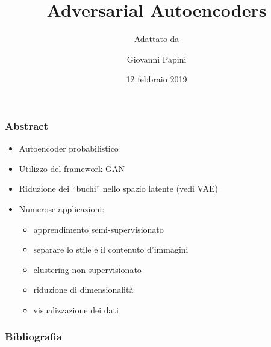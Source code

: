 \documentclass[11pt]{beamer}
\begin{document}
\author{Giovanni Papini}
\title{Adversarial Autoencoders}
\subtitle{Adattato da \cite{makhzani2015adversarial}}
\date{12 febbraio 2019}
\subject{autoencoders, neural network, AI}

\begin{frame}[plain]
\maketitle
\end{frame}

\begin{frame}
\frametitle{Abstract}

\begin{itemize}
  \item Autoencoder probabilistico
  \item Utilizzo del framework GAN
  \item Riduzione dei ``buchi'' nello spazio latente (vedi VAE)
  \item Numerose applicazioni:
  \begin{itemize}
    \item apprendimento semi-supervisionato
    \item separare lo stile e il contenuto d'immagini
    \item clustering non supervisionato
    \item riduzione di dimensionalità 
    \item visualizzazione dei dati
  \end{itemize}
\end{itemize}
\end{frame}

\begin{frame}
\frametitle{Bibliografia}
\printbibliography
\end{frame}
\end{document}
